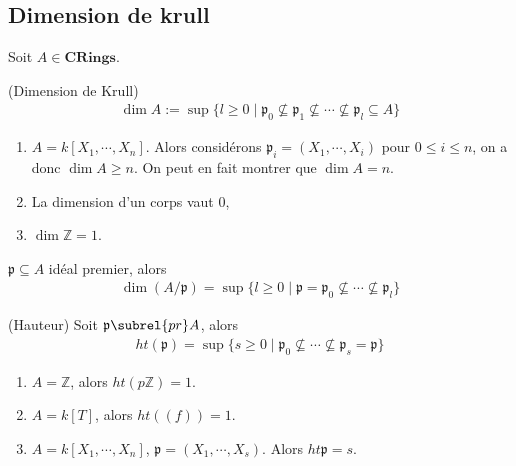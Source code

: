         \subsection{Dimension de krull}
            Soit $A \in \mathbf{CRings}$.
            \begin{defi} (Dimension de Krull)
                \begin{align*}
                    \dim A := \sup \{l \geq 0 \mid \mathfrak{p_0} \nsubseteq \mathfrak{p}_1 \nsubseteq \cdots \nsubseteq \mathfrak{p}_l \subseteq A\}
                \end{align*}
            \end{defi}
            \begin{expl}
                 \begin{enumerate}
                    \item $A = k[X_1, \cdots, X_n]$. Alors considérons $\mathfrak{p}_i = (X_1, \cdots, X_i)$ pour $0 \leq i \leq n$, on a donc $\dim A \geq n$. On peut en fait montrer que $\dim A = n$. 
                    \item La dimension d'un corps vaut $0$,
                    \item $\dim \mathbb{Z} = 1$.
                \end{enumerate}
            \end{expl}
            \begin{remq}
                $\mathfrak{p} \subseteq A$ idéal premier, alors
                \begin{align*}
                    \dim (A/\mathfrak{p}) = \sup \{l \geq 0 \mid \mathfrak{p} = \mathfrak{p}_0 \nsubseteq \cdots \nsubseteq \mathfrak{p}_l \}
                \end{align*}
            \end{remq}
            \begin{defi} (Hauteur)
                Soit $\mathfrak{p} \subrel{pr} A$, alors
                \begin{align*}
                    ht(\mathfrak{p}) = \sup \{s \geq 0 \mid \mathfrak{p}_0 \nsubseteq \cdots \nsubseteq \mathfrak{p}_s = \mathfrak{p} \}
                \end{align*}
            \end{defi}
            \begin{expl}
                \begin{enumerate}
                    \item $A = \mathbb{Z}$, alors $ht(p \mathbb{Z}) = 1$. 
                    \item $A = k[T]$, alors $ht((f)) = 1$.
                    \item $A = k[X_1, \cdots, X_n]$, $\mathfrak{p} = (X_1, \cdots, X_s)$. Alors $ht \mathfrak{p} = s$.
                \end{enumerate}
            \end{expl}
